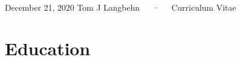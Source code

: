 \documentclass[11pt, a4paper]{awesome-cv}
\begin{document}
\makecvheader

\makecvfooter
  {December 21, 2020}
    {Tom J Langbehn~~~·~~~Curriculum Vitae}
  {\thepage}





\hypertarget{education}{%
\section{Education}\label{education}}
\end{document}
